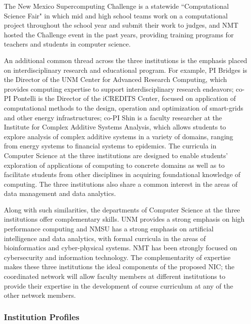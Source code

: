 The New Mexico Supercomputing Challenge is a statewide ``Computational Science Fair" in which mid and high school teams work on a computational project throughout the school year and submit their work to judges, and NMT hosted the Challenge event in the past years, providing training programs for teachers and students in computer science.


An additional common thread across the three institutions is the emphasis placed on interdisciplinary research and educational program. For example, PI Bridges is the Director of the UNM Center for Advanced Research Computing, which provides computing expertise to support interdisciplinary research endeavors; co-PI Pontelli is the Director of the iCREDITS Center, focused on application of computational methods to the design, operation and optimization of smart-grids and other energy infrastructures; co-PI Shin is a faculty researcher at the Institute for Complex Additive Systems Analysis, which allows students to explore analysis of complex additive systems in a variety of domains, ranging from energy systems to financial systems to epidemics. The curricula in Computer Science at the three institutions are  designed to enable students' exploration of applications of computing to concrete domains as well as to facilitate students from other disciplines in acquiring foundational knowledge of computing. The three institutions also share a common interest in the areas of data management and data analytics.


Along with such similarities, the departments of Computer Science at the three institutions offer complementary skills. UNM provides a strong emphasis on high performance computing and 
NMSU has a strong emphasis on artificial intelligence and data analytics, with formal curricula in the areas of bioinformatics and cyber-physical systems. 
NMT has been strongly focused on cybersecurity and information technology. The complementarity of expertise makes these three institutions the ideal components of the proposed NIC; the coordinated network will allow faculty members at different institutions to provide their expertise in the development of course curriculum at any of the other network members. 

\subsubsection{Institution Profiles}

